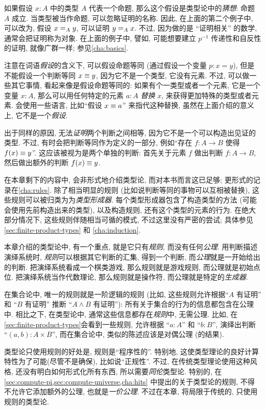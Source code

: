 如果假设 $x:A$ 中的类型 $A$ 代表一个命题, 那么这个假设是类型论中的\emph{猜想}: %
命题 $A$ 成立. 当类型被当作命题, 可以忽略证明的名称.
因此, 在上面的第二个例子中, 可以改为, 假设 $\id[A]{x}{y}$, 可以证明 $\id[A]{y}{x}$.
不过, 因为做的是 ``证明相关'' 的数学,
%
通常会把证明称为对象.
在上面的例子中, 譬如, 可能想要建立 $p^{-1}$ 传递性和自反性的证明, 就像广群一样;
参见\cref{cha:basics}.

注意在词语\emph{假设}的含义下, 可以假设命题等同 (通过假设一个变量 $p:x=y$), 但是不能假设一个判断等同 $x\jdeq y$, 因为它不是一个类型, 它没有元素.
不过, 可以做一些其它事情, 看起来像是假设命题等同的: 如果有个一类型或者一个元素, 它是一个变量 $x:A$, 那么可以用任何特定的元素 $a:A$ \emph{替换} $x$, 来获得更加特殊的类型或者元素.
会使用一些语言, 比如``假设 $x\jdeq a$'' 来指代这种替换, 虽然在上面介绍的意义上, 它不是一个\emph{假设}.

出于同样的原因, 无法\emph{证明}两个判断之间相等, 因为它不是一个可以构造出见证的类型.
不过, 有时会把判断等同作为定义的一部分, 例如``存在 $f:A\to B$ 使得 $f(x)\jdeq y$''.
这应该被视为是两个单独的判断: 首先关于元素 $f$ 做出判断  $f:A\to B$, 然后做出额外的判断 $f(x)\jdeq y$.

在本章剩下的内容中, 会非形式地介绍类型论, 而对本书而言这已足够;
更形式的记录在\cref{cha:rules}.
除了相当明显的规则 (比如说判断等同的事物可以互相被替换), 这些规则可以被归类为为\emph{类型形成器}.
每个类型形成器包含了构造类型的方法 (可能会使用先前构造出来的类型), 以及构造规则, 还有这个类型的元素的行为.
在绝大部分情况下, 这些规则伴随相当可循的模式, 不过这里没有严密的尝试;
具体参见 \cref{sec:finite-product-types} 和 \cref{cha:induction}.
%

%
%
本章介绍的类型论中, 有一个重点, 就是它只有\emph{规则}, 而没有任何\emph{公理}.
用判断描述演绎系统时, \emph{规则}可以根据其它判断的汇集, 得到一个判断, 而\emph{公理}就是一开始给出的判断.
把演绎系统看成一个棋类游戏, 那么规则就是游戏规则, 而公理就是初始点位.
把演绎系统当作代数理论, 那么规则就是操作符, 而公理就是特定的\emph{生成器}.

在集合论中, 唯一的规则就是一阶逻辑的规则 (比如, 这些规则允许根据``$A$ 有证明'' 和 ``$B$ 有证明'' 推断 ``$A\wedge B$ 有证明''): 所有关于集合的行为的信息都包含在公理中.
相比之下, 在类型论中, 通常这些信息都存在\emph{规则}中, 无需公理.
比如, 在\cref{sec:finite-product-types}会看到一些规则, 允许根据 ``$a:A$'' 和 ``$b:B$'', 演绎出判断 ``$(a,b):A\times B$'', 而在集合论中, 类似的陈述应该是对偶公理 (的结果).

类型论只使用规则的好处是, 规则是``程序性的''.
特别地, 这使类型理论的良好计算特性为了可能(尽管不是确保), 比如说``正规性''.
%
不过, 在传统类型理论使用这种风格, 还没有明白如何形式化所有东西, 所以需要\emph{同伦}类型论.
特别的, 在\cref{sec:compute-pi,sec:compute-universe,cha:hits} 中提出的关于类型论的规则, 不得不允许它添加额外的公理, 也就是\emph{一价公理}.
不过在本章, 将局限于传统的, 只使用规则的类型论.